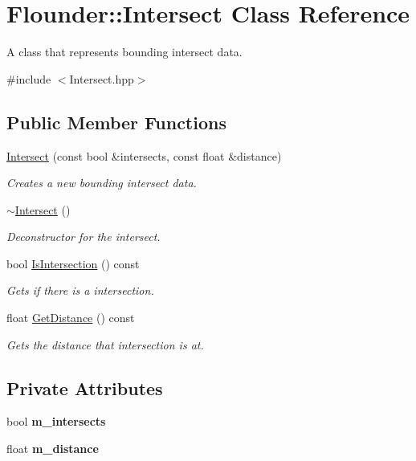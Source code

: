 \hypertarget{class_flounder_1_1_intersect}{}\section{Flounder\+:\+:Intersect Class Reference}
\label{class_flounder_1_1_intersect}


A class that represents bounding intersect data.  




{\ttfamily \#include $<$Intersect.\+hpp$>$}

\subsection*{Public Member Functions}
\begin{DoxyCompactItemize}
\item 
\hyperlink{class_flounder_1_1_intersect_aaca438965a269141dee10ac4d93c9038}{Intersect} (const bool \&intersects, const float \&distance)
\begin{DoxyCompactList}\small\item\em Creates a new bounding intersect data. \end{DoxyCompactList}\item 
\hyperlink{class_flounder_1_1_intersect_a226bc38157f0797edc21814d96165d2f}{$\sim$\+Intersect} ()
\begin{DoxyCompactList}\small\item\em Deconstructor for the intersect. \end{DoxyCompactList}\item 
bool \hyperlink{class_flounder_1_1_intersect_ac98abd3fe597e6dd1a69d6e49b605bab}{Is\+Intersection} () const
\begin{DoxyCompactList}\small\item\em Gets if there is a intersection. \end{DoxyCompactList}\item 
float \hyperlink{class_flounder_1_1_intersect_ad4bc898c338d36479fd13425270c0a98}{Get\+Distance} () const
\begin{DoxyCompactList}\small\item\em Gets the distance that intersection is at. \end{DoxyCompactList}\end{DoxyCompactItemize}
\subsection*{Private Attributes}
\begin{DoxyCompactItemize}
\item 
\mbox{\label{class_flounder_1_1_intersect_a25f51cac3d56a9eee05663a4ea8d1aab}} 
bool {\bfseries m\+\_\+intersects}
\item 
\mbox{\label{class_flounder_1_1_intersect_a9e9c853b8a7ef4b14b7a4787176749cf}} 
float {\bfseries m\+\_\+distance}
\end{DoxyCompactItemize}


